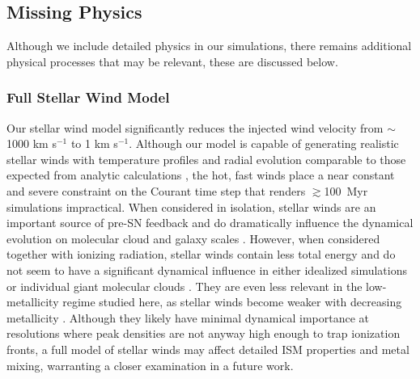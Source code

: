 \documentclass[twocolumn]{aastex61}
\begin{document}
\subsection{Missing Physics}
Although we include detailed physics in our simulations, there remains additional physical processes that may be relevant, these are discussed below.

\subsubsection{Full Stellar Wind Model}
\label{sec:stellar winds discussion}
Our stellar wind model significantly reduces the injected wind velocity from $\sim$1000 km s$^{-1}$ to 1 km s$^{-1}$. Although our model is capable of generating realistic stellar winds with temperature profiles and radial evolution comparable to those expected from analytic calculations \citep{Weaver1977}, the hot, fast winds place a near constant and severe constraint on the Courant time step that renders $\gtrsim$100~Myr simulations impractical. When considered in isolation, stellar winds are an important source of pre-SN feedback and do dramatically influence the dynamical evolution on molecular cloud and galaxy scales \citep{Dale2008,Peters2017,Gatto2017}. However, when considered together with ionizing radiation, stellar winds contain less total energy \citep{Agertz2013} and do not seem to have a significant dynamical influence in either idealized simulations \citep{Geen2015} or 
   individual giant molecular clouds
\citep{Dale2014}. They are even less relevant in the low-metallicity regime studied here, as stellar winds become weaker with decreasing metallicity \citep{Puls2000, Vink2005}. Although they likely have minimal dynamical importance
   at resolutions where peak densities are not anyway high enough to trap ionization 
   fronts, 
a full model of stellar winds may affect detailed ISM properties and metal mixing, warranting a closer examination in a future work.

\end{document}
